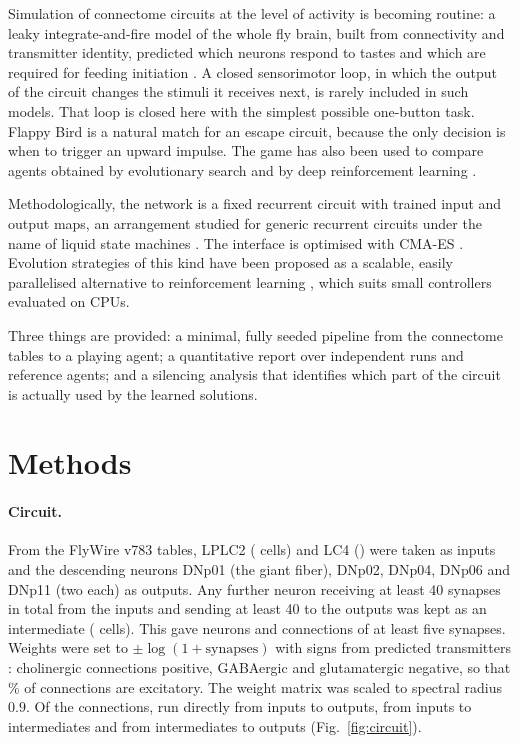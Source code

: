 \documentclass[11pt]{article}
\begin{document}
Simulation of connectome circuits at the level of activity is becoming routine: a leaky
integrate-and-fire model of the whole fly brain, built from connectivity and transmitter identity,
predicted which neurons respond to tastes and which are required for feeding initiation
\cite{shiu2024}. A closed sensorimotor loop, in which the output of the circuit changes the stimuli it
receives next, is rarely included in such models. That loop is closed here with the simplest possible
one-button task. Flappy Bird is a natural match for an escape circuit, because the only decision is
when to trigger an upward impulse. The game has also been used to compare agents obtained by
evolutionary search and by deep reinforcement learning \cite{thurler2021}.

Methodologically, the network is a fixed recurrent circuit with trained input and output maps, an
arrangement studied for generic recurrent circuits under the name of liquid state machines
\cite{maass2002}. The interface is optimised with CMA-ES \cite{hansen2001}. Evolution strategies of
this kind have been proposed as a scalable, easily parallelised alternative to reinforcement learning
\cite{salimans2017}, which suits small controllers evaluated on CPUs.

Three things are provided: a minimal, fully seeded pipeline from the connectome tables to a playing
agent; a quantitative report over independent runs and reference agents; and a silencing analysis
that identifies which part of the circuit is actually used by the learned solutions.

\section{Methods}

\paragraph{Circuit.}
From the FlyWire v783 tables, LPLC2 (\NLPLCtwo{} cells) and LC4 (\NLCfour{}) were taken as inputs and
the descending neurons DNp01 (the giant fiber), DNp02, DNp04, DNp06 and DNp11 (two each) as outputs.
Any further neuron receiving at least 40 synapses in total from the inputs and sending at least 40 to
the outputs was kept as an intermediate (\Intermediates{} cells). This gave \Neurons{} neurons and
\Edges{} connections of at least five synapses. Weights were set to $\pm\log(1+\text{synapses})$ with
signs from predicted transmitters \cite{eckstein2024}: \NAch{} cholinergic connections positive,
\NGaba{} GABAergic and \NGlut{} glutamatergic negative, so that \ExcPct\% of connections are
excitatory. The weight matrix was scaled to spectral radius $0.9$. Of the connections,
\EdgesDirect{} run directly from inputs to outputs, \EdgesInMid{} from inputs to intermediates and
\EdgesMidOut{} from intermediates to outputs (Fig.~\ref{fig:circuit}).
\end{document}
